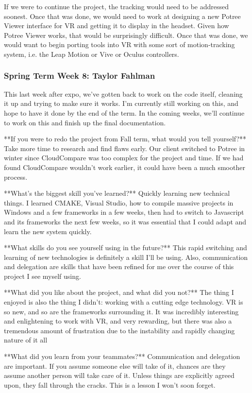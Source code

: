 \documentclass[draftclsnofoot,onecolumn]{IEEEtran}
\begin{document}
If we were to continue the project, the tracking would need to be addressed soonest. Once that was done, we would need to work at designing a new Potree Viewer interface for VR and getting it to display in the headset. Given how Potree Viewer works, that would be surprisingly difficult. Once that was done, we would want to begin porting tools into VR with some sort of motion-tracking system, i.e. the Leap Motion or Vive or Oculus controllers.

\subsubsection{Spring Term Week 8: Taylor Fahlman}

This last week after expo, we've gotten back to work on the code itself, cleaning it up and trying to make sure it works. I'm currently still working on this, and hope to have it done by the end of the term. In the coming weeks, we'll continue to work on this and finish up the final documentation.


**If you were to redo the project from Fall term, what would you tell yourself?**
Take more time to research and find flaws early. Our client switched to Potree in winter since CloudCompare was too complex for the project and time. If we had found CloudCompare wouldn't work earlier, it could have been a much smoother process. 

**What's the biggest skill you've learned?**
Quickly learning new technical things. I learned CMAKE, Visual Studio, how to compile massive projects in Windows and a few frameworks in a few weeks, then had to switch to Javascript and its frameworks the next few weeks, so it was essential that I could adapt and learn the new system quickly. 

**What skills do you see yourself using in the future?**
This rapid switching and learning of new technologies is definitely a skill I'll be using. Also, communication and delegation are skills that have been refined for me over the course of this project I see myself using.

**What did you like about the project, and what did you not?**
The thing I enjoyed is also the thing I didn't: working with a cutting edge technology. VR is so new, and so are the frameworks surrounding it. It was incredibly interesting and enlightening to work with VR, and very rewarding, but there was also a tremendous amount of frustration due to the instability and rapidly changing nature of it all

**What did you learn from your teammates?**
Communication and delegation are important. If you assume someone else will take of it, chances are they assume another person will take care of it. Unless things are explicitly agreed upon, they fall through the cracks. This is a lesson I won't soon forget. 
\end{document}
